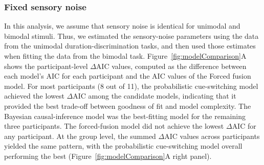 \documentclass{biorxiv}
\begin{document}



\subsubsection{Fixed sensory noise}
In this analysis, we assume that sensory noise is identical for unimodal and bimodal stimuli. Thus, we estimated the sensory-noise parameters using the data from the unimodal duration-discrimination tasks, and then used those estimates when fitting the data from the bimodal task. Figure~\ref{fig:modelComparison}A shows the participant-level $\Delta$AIC values, computed as the difference between each model's AIC for each participant and the AIC values of the Forced fusion model. For most participants (8 out of 11), the probabilistic cue-switching model achieved the lowest $\Delta$AIC among the candidate models, indicating that it provided the best trade-off between goodness of fit and model complexity. The Bayesian causal-inference model was the best-fitting model for the remaining three participants. The forced-fusion model did not achieve the lowest $\Delta$AIC for any participant. At the group level, the summed $\Delta$AIC values across participants yielded the same pattern, with the probabilistic cue-switching model overall performing the best (Figure~\ref{fig:modelComparison}A right panel). 
\end{document}
